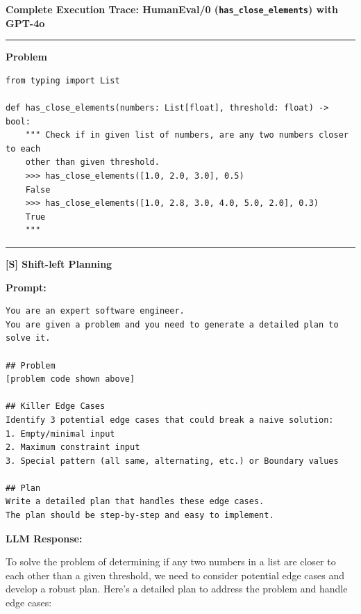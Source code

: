 \documentclass[11pt]{article}
\begin{document}
\begin{tcolorbox}[breakable, colback=white, colframe=black!70, boxrule=0.5pt, arc=2pt, left=4mm, right=4mm, top=3mm, bottom=3mm]

\vspace{2mm}
\textbf{\large Complete Execution Trace: HumanEval/0 (\texttt{has\_close\_elements}) with GPT-4o}
\hrule
\vspace{5mm}

\noindent\textbf{\Large Problem}

\begin{verbatim}
from typing import List

def has_close_elements(numbers: List[float], threshold: float) -> bool:
    """ Check if in given list of numbers, are any two numbers closer to each 
    other than given threshold.
    >>> has_close_elements([1.0, 2.0, 3.0], 0.5)
    False
    >>> has_close_elements([1.0, 2.8, 3.0, 4.0, 5.0, 2.0], 0.3)
    True
    """
\end{verbatim}

\vspace{0.5cm} \hrule \vspace{0.5cm}

\noindent\textbf{\Large [S] Shift-left Planning}

\textbf{Prompt:}
\begin{verbatim}
You are an expert software engineer.
You are given a problem and you need to generate a detailed plan to solve it.

## Problem
[problem code shown above]

## Killer Edge Cases
Identify 3 potential edge cases that could break a naive solution:
1. Empty/minimal input
2. Maximum constraint input
3. Special pattern (all same, alternating, etc.) or Boundary values

## Plan
Write a detailed plan that handles these edge cases.
The plan should be step-by-step and easy to implement.
\end{verbatim}

\textbf{LLM Response:}

To solve the problem of determining if any two numbers in a list are closer to each other than a given threshold, we need to consider potential edge cases and develop a robust plan. Here's a detailed plan to address the problem and handle edge cases:


\end{tcolorbox}
\end{document}

